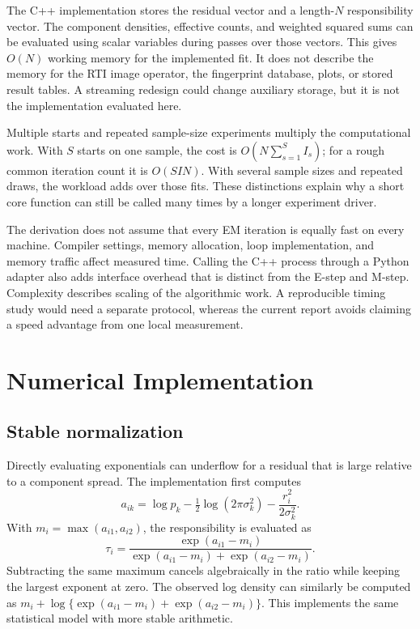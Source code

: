 \documentclass[conference,letterpaper]{IEEEtran}
\begin{document}
The C++ implementation stores the residual vector and a length-$N$ responsibility vector. The component densities, effective counts, and weighted squared sums can be evaluated using scalar variables during passes over those vectors. This gives $O(N)$ working memory for the implemented fit. It does not describe the memory for the RTI image operator, the fingerprint database, plots, or stored result tables. A streaming redesign could change auxiliary storage, but it is not the implementation evaluated here.

Multiple starts and repeated sample-size experiments multiply the computational work. With $S$ starts on one sample, the cost is $O(N\sum_{s=1}^S I_s)$; for a rough common iteration count it is $O(SIN)$. With several sample sizes and repeated draws, the workload adds over those fits. These distinctions explain why a short core function can still be called many times by a longer experiment driver.

The derivation does not assume that every EM iteration is equally fast on every machine. Compiler settings, memory allocation, loop implementation, and memory traffic affect measured time. Calling the C++ process through a Python adapter also adds interface overhead that is distinct from the E-step and M-step. Complexity describes scaling of the algorithmic work. A reproducible timing study would need a separate protocol, whereas the current report avoids claiming a speed advantage from one local measurement.

\section{Numerical Implementation}
\label{sec:numerical}
\subsection{Stable normalization}
Directly evaluating exponentials can underflow for a residual that is large relative to a component spread. The implementation first computes
\begin{equation}
a_{ik}=\log p_k-\tfrac12\log(2\pi\sigma_k^2)
-\frac{r_i^2}{2\sigma_k^2}.
\end{equation}
With $m_i=\max(a_{i1},a_{i2})$, the responsibility is evaluated as
\begin{equation}
\tau_i=\frac{\exp(a_{i1}-m_i)}
{\exp(a_{i1}-m_i)+\exp(a_{i2}-m_i)}.
\end{equation}
Subtracting the same maximum cancels algebraically in the ratio while keeping the largest exponent at zero. The observed log density can similarly be computed as $m_i+\log\{\exp(a_{i1}-m_i)+\exp(a_{i2}-m_i)\}$. This implements the same statistical model with more stable arithmetic.
\end{document}
